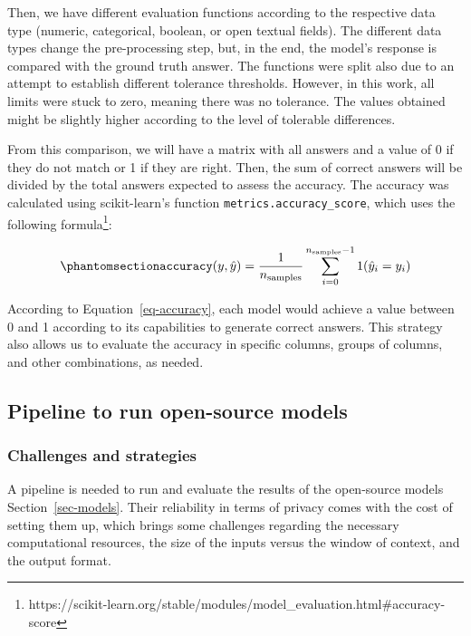 \documentclass[
  12pt,
]{article}
\begin{document}
Then, we have different evaluation functions according to the respective
data type (numeric, categorical, boolean, or open textual fields). The
different data types change the pre-processing step, but, in the end,
the model's response is compared with the ground truth answer. The
functions were split also due to an attempt to establish different
tolerance thresholds. However, in this work, all limits were stuck to
zero, meaning there was no tolerance. The values obtained might be
slightly higher according to the level of tolerable differences.

From this comparison, we will have a matrix with all answers and a value
of 0 if they do not match or 1 if they are right. Then, the sum of
correct answers will be divided by the total answers expected to assess
the accuracy. The accuracy was calculated using scikit-learn's function
\texttt{metrics.accuracy\_score}, which uses the following
formula\footnote{https://scikit-learn.org/stable/modules/model\_evaluation.html\#accuracy-score}:

\begin{equation}\phantomsection\label{eq-accuracy}{
\texttt{accuracy}(y, \hat{y}) = \frac{1}{n_\text{samples}} \sum_{i=0}^{n_\text{samples}-1} 1(\hat{y}_i = y_i) 
}\end{equation}

According to Equation~\ref{eq-accuracy}, each model would achieve a
value between 0 and 1 according to its capabilities to generate correct
answers. This strategy also allows us to evaluate the accuracy in
specific columns, groups of columns, and other combinations, as needed.

\subsection{Pipeline to run open-source
models}\label{pipeline-to-run-open-source-models}

\subsubsection{Challenges and
strategies}\label{challenges-and-strategies}

A pipeline is needed to run and evaluate the results of the open-source
models Section~\ref{sec-models}. Their reliability in terms of privacy
comes with the cost of setting them up, which brings some challenges
regarding the necessary computational resources, the size of the inputs
versus the window of context, and the output format.
\end{document}
